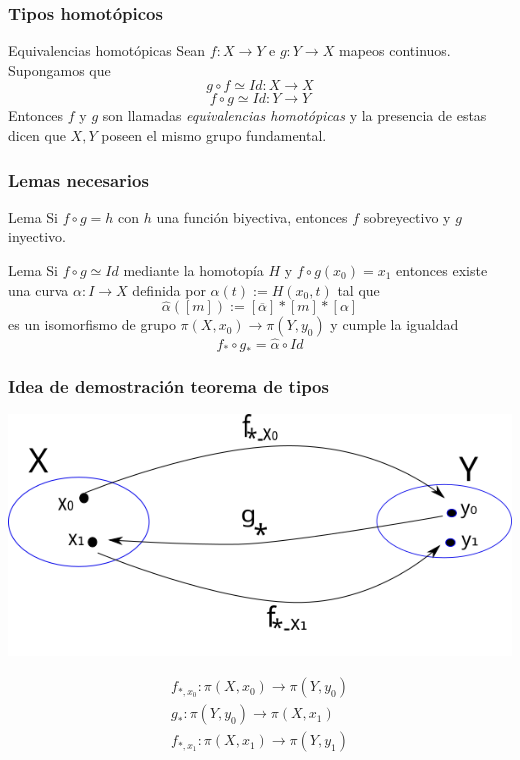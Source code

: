 \documentclass[xetex,mathserif,serif]{beamer}
\begin{document}
  \begin{frame}
    \frametitle{Tipos homotópicos}
    \begin{block}{Equivalencias homotópicas}
      Sean \(f : X \to Y\) e \(g : Y \to X\) mapeos continuos. Supongamos
      que \[ g \circ f \simeq Id : X \to X \]
      \[ f \circ g \simeq Id : Y \to Y \]
      Entonces \(f\) y \(g\) son llamadas \emph{equivalencias
      homotópicas} y la presencia de estas dicen que \(X,Y\) poseen el
      mismo grupo fundamental.
    \end{block}

  \end{frame}
  \begin{frame}
    \frametitle{Lemas necesarios}
    \begin{block}{Lema}
      Si \(f \circ g = h\) con \(h\) una función biyectiva, entonces
      \(f\) sobreyectivo y \(g\) inyectivo.
    \end{block}
    \begin{block}{Lema}
      Si \(f \circ g \simeq Id\) mediante la homotopía \(H\) y \(f \circ
      g (x_0) = x_1\) entonces existe una curva \(\alpha : I \to X\)
      definida por \(\alpha (t) := H (x_0 , t)\) tal que
      \[ \hat \alpha \left( [m] \right) := [ \overline \alpha] * [m] * [\alpha]\]
      es un isomorfismo de grupo \(\pi(X,x_0) \to \pi (Y,y_0)\) y cumple
      la igualdad
      \[ f_* \circ g_* = \hat \alpha \circ Id \]
    \end{block}
  \end{frame}

  \begin{frame}
    \frametitle{Idea de demostración teorema de tipos}
    \begin{center}
      \includegraphics[scale=0.5]{./imag/teo_tipos.png}
    \end{center}
    \begin{gather*}
      f_{*,x_0} : \pi (X, x_0) \to \pi (Y, y_0) \\
      g_* : \pi (Y, y_0) \to \pi (X, x_1) \\
      f_{*,x_1} : \pi (X, x_1) \to \pi (Y, y_1)
    \end{gather*}
  \end{frame}
\end{document}
